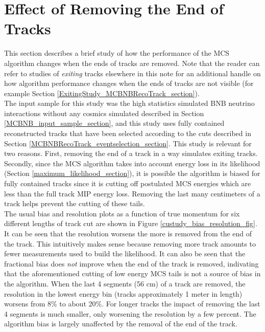 \clearpage
\section{Effect of Removing the End of Tracks}\label{CutStudy_MCBNBRecoTrack_section}
This section describes a brief study of how the performance of the MCS algorithm changes when the ends of tracks are removed. Note that the reader can refer to studies of \textit{exiting} tracks elsewhere in this note for an additional handle on how algorithm performance changes when the ends of tracks are not visible (for example Section \ref{ExitingStudy_MCBNBRecoTrack_section}).\\


The input sample for this study was the high statistics simulated BNB neutrino interactions without any cosmics simulated described in Section \ref{MCBNB_input_sample_section}, and this study uses fully contained reconstructed tracks that have been selected according to the cuts described in Section \ref{MCBNBRecoTrack_eventselection_section}. This study is relevant for two reasons. First, removing the end of a track in a way simulates exiting tracks. Secondly, since the MCS algorithm takes into account energy loss in its likelihood (Section \ref{maximum_likelihood_section}), it is possible the algorithm is biased for fully contained tracks since it is cutting off postulated MCS energies which are less than the full track MIP energy loss. Removing the last many centimeters of a track helps prevent the cutting of these tails.\\

The usual bias and resolution plots as a function of true momentum for six different lengths of track cut are shown in Figure \ref{custudy_bias_resolution_fig}. It can be seen that the resolution worsens the more is removed from the end of the track. This intuitively makes sense because removing more track amounts to fewer measurements used to build the likelihood. It can also be seen that the fractional bias does \textit{not} improve when the end of the track is removed, indivating that the aforementioned cutting of low energy MCS tails is not a source of bias in the algorithm. When the last 4 segments (56 cm) of a track are removed, the resolution in the lowest energy bin (tracks approximately 1 meter in length) worsens from 8\% to about 20\%. For longer tracks the impact of removing the last 4 segments is much smaller, only worsening the resolution by a few percent. The algorithm bias is largely unaffected by the removal of the end of the track.\\

